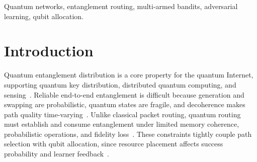 \documentclass[10pt,journal]{IEEEtran}
\newcommand{\devroop}[1]{\textcolor{magenta}{\textit{[Devroop: #1]}}}
\begin{document}
\begin{abstract}
\end{abstract}

\begin{IEEEkeywords}
Quantum networks, entanglement routing, multi-armed bandits, adversarial learning, qubit allocation.
\end{IEEEkeywords}

\section{Introduction}\label{sec:Introduction}

Quantum entanglement distribution is a core property for the quantum Internet, supporting quantum key distribution, distributed quantum computing, and sensing~\cite{kimble2008quantum,wehner2018quantum,pompili2021realization}. Reliable end-to-end entanglement is difficult because generation and swapping are probabilistic, quantum states are fragile, and decoherence makes path quality time-varying~\cite{briegel1998quantum,dahlberg2021netsquid,zukowski1993event}. Unlike classical packet routing, quantum routing must establish and consume entanglement under limited memory coherence, probabilistic operations, and fidelity loss~\cite{bennett1993teleporting,zukowski1993event}. These constraints tightly couple path selection with qubit allocation, since resource placement affects success probability and learner feedback~\cite{li2025multipath,wang2025learning,huang2024quantum}.
\end{document}
